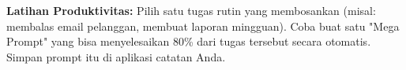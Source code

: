 \begin{exercisebox}
\textbf{Latihan Produktivitas:}
Pilih satu tugas rutin yang membosankan (misal: membalas email pelanggan, membuat laporan mingguan).
Coba buat satu "Mega Prompt" yang bisa menyelesaikan 80\% dari tugas tersebut secara otomatis. Simpan prompt itu di aplikasi catatan Anda.
\end{exercisebox}
